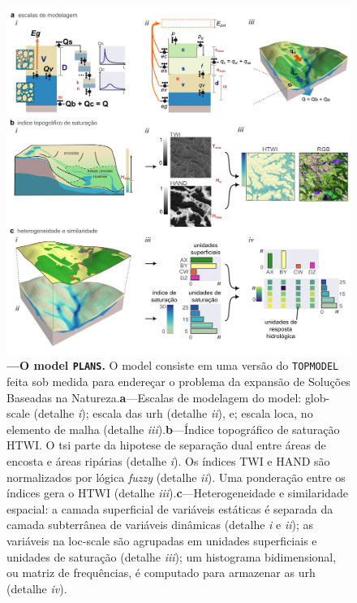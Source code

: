 \documentclass[./main.tex]{subfiles}
\begin{document}
\begin{figure}[t!] 
\centering				
\includegraphics[width=0.98\linewidth]{figs/fig_plans.jpg}		
\caption[O \gls{model} \texttt{PLANS}]
{\textbf{---\;O \gls{model} \texttt{PLANS}.} O \gls{model} consiste em uma versão do \texttt{TOPMODEL} feita sob medida para endereçar o problema da expansão de Soluções Baseadas na Natureza.\;\textbf{a}\;---\;Escalas de modelagem do \gls{model}: \gls{glob-scale} (detalhe \textrm{\textit{i}}); escala das \gls{urh} (detalhe \textrm{\textit{ii}}), e; escala loca, no elemento de malha (detalhe \textrm{\textit{iii}}).\;\textbf{b}\;---\;Índice topográfico de saturação HTWI. O \gls{tsi} parte da \gls{hipotese} de separação dual entre áreas de encosta e áreas ripárias (detalhe \textrm{\textit{i}}). Os índices TWI e HAND são normalizados por lógica \textit{fuzzy} (detalhe \textrm{\textit{ii}}). Uma ponderação entre os índices gera o HTWI (detalhe \textrm{\textit{iii}}).\;\textbf{c}\;---\;Heterogeneidade e similaridade espacial: a camada superficial de variáveis estáticas é separada da camada subterrânea de variáveis dinâmicas (detalhe \textrm{\textit{i}} e \textrm{\textit{ii}}); as variáveis na \gls{loc-scale} são agrupadas em unidades superficiais e unidades de saturação (detalhe \textrm{\textit{iii}}); um histograma bidimensional, ou matriz de frequências, é computado para armazenar as \gls{urh} (detalhe \textrm{\textit{iv}}).
}
\label{fig:hydro:plans} 		
\end{figure}
\end{document}
